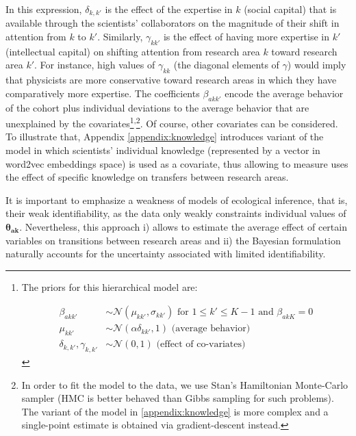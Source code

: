 \documentclass{article}
\begin{document}
In this expression, $\delta_{k,k'}$ is the effect of the expertise in $k$ (social capital) that is available through the scientists' collaborators on the magnitude of their shift in attention from $k$ to $k'$. Similarly, $\gamma_{kk'}$ is the effect of having more expertise in $k'$ (intellectual capital) on shifting attention from research area $k$ toward research area $k'$. For instance, high values of $\gamma_{kk}$ (the diagonal elements of $\gamma$) would imply that physicists are more conservative toward research areas in which they have comparatively more expertise. The coefficients $\beta_{akk'}$ encode the average behavior of the cohort plus individual deviations to the average behavior that are unexplained by the covariates\footnote{The priors for this hierarchical model are:

\begin{align}
    \beta_{akk'} &\sim \mathcal{N}(\mu_{k k'},\sigma_{k k'}) \text{ for } 1\leq k' \leq K-1 \text{ and } \beta_{ak K} = 0\\
    \mu_{k k'} &\sim \mathcal{N}(\alpha \delta_{kk'},1) \text{ (average behavior)}\\
    \delta_{k,k'},\gamma_{k,k'} &\sim \mathcal{N}(0,1)  \text { (effect of co-variates)}
\end{align}
}\textsuperscript{,}\footnote{In order to fit the model to the data, we use Stan's Hamiltonian Monte-Carlo sampler (HMC is better behaved than Gibbs sampling for such problems). The variant of the model in \ref{appendix:knowledge} is more complex and a single-point estimate is obtained via gradient-descent instead.}. Of course, other covariates can be considered. To illustrate that, Appendix \ref{appendix:knowledge} 
 introduces variant of the model in which scientists' individual knowledge (represented by a vector in word2vec embeddings space) is used as a covariate, thus allowing to measure uses the effect of specific knowledge on transfers between research areas.

It is important to emphasize a weakness of models of ecological inference, that is, their weak identifiability, as the data only weakly constraints individual values of $\bm{\theta_{ak}}$.  %
Nevertheless, this approach i) allows to estimate the average effect of certain variables on transitions between research areas and ii) the Bayesian formulation naturally accounts for the uncertainty associated with limited identifiability.
\end{document}
